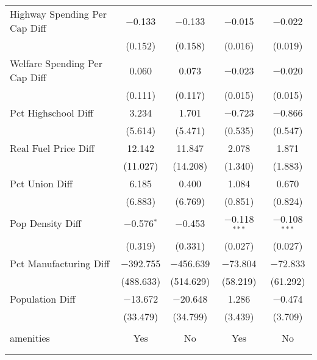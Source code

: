 \begin{table}[!htbp]
\begin{tabular}{@{\extracolsep{5pt}}lcccc}
  Highway Spending Per Cap Diff & $-$0.133 & $-$0.133 & $-$0.015 & $-$0.022 \\ 
  & (0.152) & (0.158) & (0.016) & (0.019) \\ 
  Welfare Spending Per Cap Diff & 0.060 & 0.073 & $-$0.023 & $-$0.020 \\ 
  & (0.111) & (0.117) & (0.015) & (0.015) \\ 
  Pct Highschool Diff & 3.234 & 1.701 & $-$0.723 & $-$0.866 \\ 
  & (5.614) & (5.471) & (0.535) & (0.547) \\ 
  Real Fuel Price Diff & 12.142 & 11.847 & 2.078 & 1.871 \\ 
  & (11.027) & (14.208) & (1.340) & (1.883) \\ 
  Pct Union Diff & 6.185 & 0.400 & 1.084 & 0.670 \\ 
  & (6.883) & (6.769) & (0.851) & (0.824) \\ 
  Pop Density Diff & $-$0.576$^{*}$ & $-$0.453 & $-$0.118$^{***}$ & $-$0.108$^{***}$ \\ 
  & (0.319) & (0.331) & (0.027) & (0.027) \\ 
  Pct Manufacturing Diff & $-$392.755 & $-$456.639 & $-$73.804 & $-$72.833 \\ 
  & (488.633) & (514.629) & (58.219) & (61.292) \\ 
  Population Diff & $-$13.672 & $-$20.648 & 1.286 & $-$0.474 \\ 
  & (33.479) & (34.799) & (3.439) & (3.709) \\ 
 \hline \\[-1.8ex] 
amenities & Yes & No & Yes & No \\ 
\hline \\[-1.8ex] 
\hline 
\hline \\[-1.8ex] 
\end{tabular} 
\end{table} 
